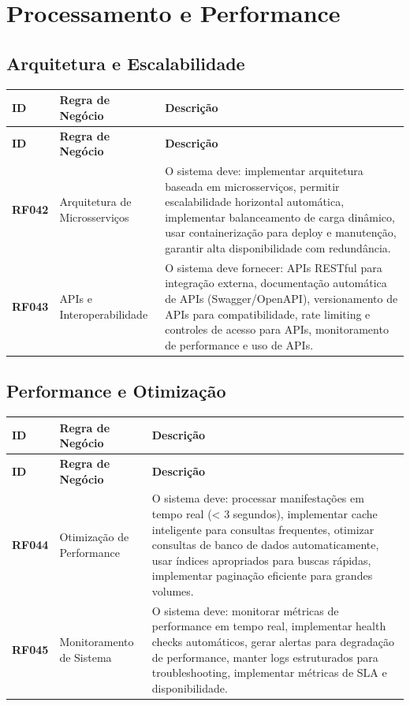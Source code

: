 \documentclass[12pt,a4paper]{article}
\newcommand{\rf}[1]{\textbf{\color{primaryblue}RF#1}}
\begin{document}
\section{Processamento e Performance}

\subsection{Arquitetura e Escalabilidade}

\begin{longtable}{|p{2cm}|p{5cm}|p{8cm}|}
\hline
\textbf{ID} & \textbf{Regra de Negócio} & \textbf{Descrição} \\
\hline
\endfirsthead
\hline
\textbf{ID} & \textbf{Regra de Negócio} & \textbf{Descrição} \\
\hline
\endhead

\rf{042} & Arquitetura de Microsserviços & O sistema deve: implementar arquitetura baseada em microsserviços, permitir escalabilidade horizontal automática, implementar balanceamento de carga dinâmico, usar containerização para deploy e manutenção, garantir alta disponibilidade com redundância. \\
\hline

\rf{043} & APIs e Interoperabilidade & O sistema deve fornecer: APIs RESTful para integração externa, documentação automática de APIs (Swagger/OpenAPI), versionamento de APIs para compatibilidade, rate limiting e controles de acesso para APIs, monitoramento de performance e uso de APIs. \\
\hline

\end{longtable}

\subsection{Performance e Otimização}

\begin{longtable}{|p{2cm}|p{5cm}|p{8cm}|}
\hline
\textbf{ID} & \textbf{Regra de Negócio} & \textbf{Descrição} \\
\hline
\endfirsthead
\hline
\textbf{ID} & \textbf{Regra de Negócio} & \textbf{Descrição} \\
\hline
\endhead

\rf{044} & Otimização de Performance & O sistema deve: processar manifestações em tempo real (< 3 segundos), implementar cache inteligente para consultas frequentes, otimizar consultas de banco de dados automaticamente, usar índices apropriados para buscas rápidas, implementar paginação eficiente para grandes volumes. \\
\hline

\rf{045} & Monitoramento de Sistema & O sistema deve: monitorar métricas de performance em tempo real, implementar health checks automáticos, gerar alertas para degradação de performance, manter logs estruturados para troubleshooting, implementar métricas de SLA e disponibilidade. \\
\hline

\end{longtable}
\end{document}
